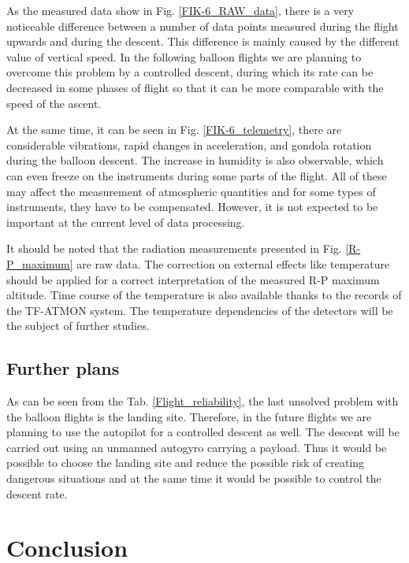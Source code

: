 \documentclass{Rpd}
\begin{document}
As the measured data show in Fig. \ref{FIK-6_RAW_data}, there is a very noticeable difference between a number of data points measured during the flight upwards and during the descent. This difference is mainly caused by the  different value of vertical speed. In the following balloon flights we are planning to overcome this problem by a controlled descent, during which its rate can be decreased in some phases of flight so that it can be more comparable with the speed of the ascent.

At the same time, it can be seen in Fig. \ref{FIK-6_telemetry}, there are considerable vibrations, rapid changes in acceleration, and gondola rotation during the balloon descent. The increase in humidity is also observable, which can even freeze on the instruments during some parts of the flight. All of these may affect the measurement of atmospheric quantities and for some types of instruments, they have to be compensated. However, it is not expected to be important at the current level of data processing.

It should be noted that the radiation measurements presented in Fig. \ref{R-P_maximum} are raw data. The correction on external effects like temperature should be applied for a correct interpretation of the measured R-P maximum altitude. Time course of the temperature is also available thanks to the records of the TF-ATMON system. The temperature dependencies of the detectors  will be the subject of further studies.


\subsection{Further plans}

As can be seen from the Tab. \ref{Flight_reliability}, the last unsolved problem with the balloon flights is the landing site. Therefore, in the future flights we are planning to use the autopilot for a controlled descent as well.
The descent will be carried out using an unmanned autogyro carrying a payload. Thus it would be possible to choose the landing site and reduce the possible risk of creating dangerous situations and at the same time it would be possible to control the descent rate. 

\section{Conclusion}
\end{document}
